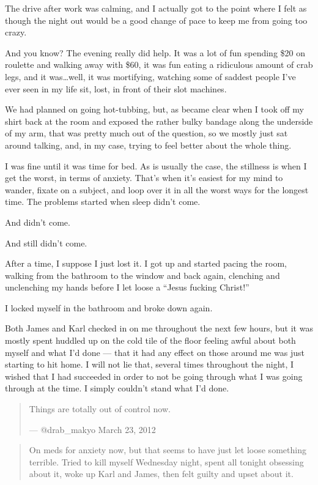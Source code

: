 \begin{paracol}{2}
\begin{leftcolumn}
The drive after work was calming, and I actually got to the point where I felt as though the night out would be a good change of pace to keep me from going too crazy.

And you know? The evening really did help. It was a lot of fun spending \$20 on roulette and walking away with \$60, it was fun eating a ridiculous amount of crab legs, and it was\ldots{}well, it was mortifying, watching some of saddest people I've ever seen in my life sit, lost, in front of their slot machines.

We had planned on going hot-tubbing, but, as became clear when I took off my shirt back at the room and exposed the rather bulky bandage along the underside of my arm, that was pretty much out of the question, so we mostly just sat around talking, and, in my case, trying to feel better about the whole thing.

I was fine until it was time for bed. As is usually the case, the stillness is when I get the worst, in terms of anxiety. That's when it's easiest for my mind to wander, fixate on a subject, and loop over it in all the worst ways for the longest time. The problems started when sleep didn't come.

And didn't come.

And still didn't come.

After a time, I suppose I just lost it. I got up and started pacing the room, walking from the bathroom to the window and back again, clenching and unclenching my hands before I let loose a ``Jesus fucking Christ!''

I locked myself in the bathroom and broke down again.

Both James and Karl checked in on me throughout the next few hours, but it was mostly spent huddled up on the cold tile of the floor feeling awful about both myself and what I'd done --- that it had any effect on those around me was just starting to hit home. I will not lie that, several times throughout the night, I wished that I had succeeded in order to not be going through what I was going through at the time. I simply couldn't stand what I'd done.
\newpage

\begin{quotation}
  \noindent Things are totally out of control now.

--- @drab\_makyo March 23, 2012
\end{quotation}

\begin{quotation}
\noindent On meds for anxiety now, but that seems to have just let loose something terrible. Tried to kill myself Wednesday night, spent all tonight obsessing about it, woke up Karl and James, then felt guilty and upset about it.


\end{quotation}
\end{leftcolumn}
\end{paracol}
